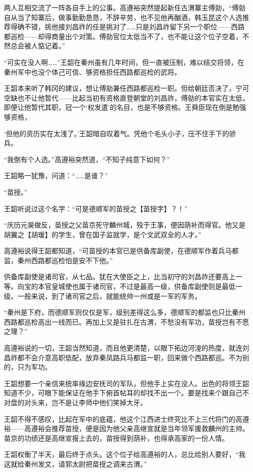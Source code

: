 两人互相交流了一阵各自手上的公事。高遵裕突然提起新任古渭寨主傅勍，“傅勍自从当了知寨后，做事勤勤恳恳，不辞辛劳，也不见他再酗酒，韩玉昆这个人选推荐得确不错，挑他接刘昌祚的任是挑对了……只是刘昌祚留下另一个职位——西路都巡检——却得商量出个对策。傅勍官位太低当不了，也不能让这个位子空着，不然总会被人惦记着。”

“可实在没人啊……”王韶在秦州虽有几年时间，但一直被压制，难以结交将领，在秦州军中也没个体己可信、够资格担任西路都巡检的武将。

王韶本来听了韩冈的建议，想让傅勍兼任西路都巡检一职。但给朝廷否决了，宁可空缺也不让他暂代——比起当初有资格直登朝堂的刘昌祚，傅勍的本官实在太低，即便让他暂代其职，冠一个‘权发遣’的名目，也是不够资格。王舜臣现在倒是勉强够资格，

‘但他的资历实在太浅了。’王韶暗自叹着气。凭他个毛头小子，压不住手下的骄兵。

“我倒有个人选。”高遵裕突然道，“不知子纯意下如何？”

王韶略一犹豫，问道：“……是谁？”

“苗授。”

王韶听说过这个名字：“可是德顺军的苗授之【苗授字】？！”

“庆历元昊做反，苗授之父苗京死守麟州城，殁于王事，便因荫补而得官。他又是胡翼之【胡瑗】的学生，曾在国子监就学，是个文武双全的人才。”

高遵裕说得王韶都知道，“可苗授的本官已是供备库副使，在德顺军作着兵马都监，秦州西路都巡检怕是安不下他。”

供备库副使是诸司官，从七品。犹在大使臣之上，比当初守的刘昌祚还要高上一等。向宝的本官皇城使也属于诸司官，不过是最高一级，供备库副使则是最低一级。一般来说，到了诸司官之后，就能统帅一州或是一军的军务。

“秦州是下府，而德顺军则仅仅是军，级别差得这么多，德顺军的都监也只比秦州西路都巡检高出一线而已。再加上又是驻扎在古渭，不愁没有军功，苗授岂有不愿之理？”

高遵裕说的一切，王韶当然知道，而且他更清楚，以眼下拓边河湟的热度，就连刘昌祚都不会介意高职低配，放弃秦凤路兵马都监一职，回来做个西路都巡。不为别的，只为军功。

王韶想要一个亲信来统率缘边安抚司的军队，但他手上实在没人。出色的将领王韶知道不少，可眼下能保证在他手下俯首帖耳的却找不出一个。要是找来个跟自己不对盘的对头来，岂不是让李师中他们笑掉大牙。

王韶不得不感叹，比起在军中的底蕴，他这个江西进士终究比不上三代将门的高遵裕——高遵裕会推荐苗授，便是因为他父亲高继宣就是当年领军援救麟州的主帅。苗京的功绩还是高继宣报上去的，苗授得到荫补，也得承高家的一份人情。

王韶权衡了半天，最后终于点头。这个位子给高遵裕的人，总比给别人要好，“我这就给秦州发文，请郭太尉把苗授之调来古渭。”

